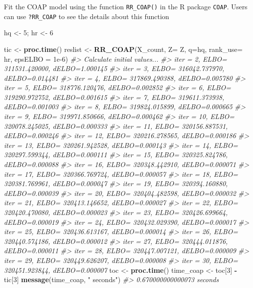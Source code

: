 \documentclass[
]{article}
\newenvironment{Shaded}{\begin{snugshade}}{\end{snugshade}}
\newcommand{\CommentTok}[1]{\textcolor[rgb]{0.56,0.35,0.01}{\textit{#1}}}
\newcommand{\DataTypeTok}[1]{\textcolor[rgb]{0.13,0.29,0.53}{#1}}
\newcommand{\DecValTok}[1]{\textcolor[rgb]{0.00,0.00,0.81}{#1}}
\newcommand{\FloatTok}[1]{\textcolor[rgb]{0.00,0.00,0.81}{#1}}
\newcommand{\KeywordTok}[1]{\textcolor[rgb]{0.13,0.29,0.53}{\textbf{#1}}}
\newcommand{\NormalTok}[1]{#1}
\newcommand{\OperatorTok}[1]{\textcolor[rgb]{0.81,0.36,0.00}{\textbf{#1}}}
\newcommand{\StringTok}[1]{\textcolor[rgb]{0.31,0.60,0.02}{#1}}
\begin{document}
Fit the COAP model using the function \texttt{RR\_COAP()} in the R
package \texttt{COAP}. Users can use \texttt{?RR\_COAP} to see the
details about this function

\begin{Shaded}
\begin{Highlighting}[]
\NormalTok{hq <-}\StringTok{ }\DecValTok{5}\NormalTok{; hr <-}\StringTok{ }\DecValTok{6}

\NormalTok{tic <-}\StringTok{ }\KeywordTok{proc.time}\NormalTok{()}
\NormalTok{reslist <-}\StringTok{ }\KeywordTok{RR_COAP}\NormalTok{(X_count, }\DataTypeTok{Z=}\NormalTok{ Z, }\DataTypeTok{q=}\NormalTok{hq, }\DataTypeTok{rank_use=}\NormalTok{ hr, }\DataTypeTok{epsELBO =} \FloatTok{1e-6}\NormalTok{)}
\CommentTok{#> Calculate initial values...}
\CommentTok{#> iter = 2, ELBO= 311531.420000, dELBO=1.000145 }
\CommentTok{#> iter = 3, ELBO= 316042.737970, dELBO=0.014481 }
\CommentTok{#> iter = 4, ELBO= 317869.490388, dELBO=0.005780 }
\CommentTok{#> iter = 5, ELBO= 318776.120476, dELBO=0.002852 }
\CommentTok{#> iter = 6, ELBO= 319290.972752, dELBO=0.001615 }
\CommentTok{#> iter = 7, ELBO= 319611.373938, dELBO=0.001003 }
\CommentTok{#> iter = 8, ELBO= 319824.015899, dELBO=0.000665 }
\CommentTok{#> iter = 9, ELBO= 319971.850666, dELBO=0.000462 }
\CommentTok{#> iter = 10, ELBO= 320078.245025, dELBO=0.000333 }
\CommentTok{#> iter = 11, ELBO= 320156.887531, dELBO=0.000246 }
\CommentTok{#> iter = 12, ELBO= 320216.278565, dELBO=0.000186 }
\CommentTok{#> iter = 13, ELBO= 320261.942528, dELBO=0.000143 }
\CommentTok{#> iter = 14, ELBO= 320297.599344, dELBO=0.000111 }
\CommentTok{#> iter = 15, ELBO= 320325.824786, dELBO=0.000088 }
\CommentTok{#> iter = 16, ELBO= 320348.442910, dELBO=0.000071 }
\CommentTok{#> iter = 17, ELBO= 320366.769724, dELBO=0.000057 }
\CommentTok{#> iter = 18, ELBO= 320381.769961, dELBO=0.000047 }
\CommentTok{#> iter = 19, ELBO= 320394.160880, dELBO=0.000039 }
\CommentTok{#> iter = 20, ELBO= 320404.482598, dELBO=0.000032 }
\CommentTok{#> iter = 21, ELBO= 320413.146652, dELBO=0.000027 }
\CommentTok{#> iter = 22, ELBO= 320420.470080, dELBO=0.000023 }
\CommentTok{#> iter = 23, ELBO= 320426.699664, dELBO=0.000019 }
\CommentTok{#> iter = 24, ELBO= 320432.029390, dELBO=0.000017 }
\CommentTok{#> iter = 25, ELBO= 320436.613167, dELBO=0.000014 }
\CommentTok{#> iter = 26, ELBO= 320440.574186, dELBO=0.000012 }
\CommentTok{#> iter = 27, ELBO= 320444.011876, dELBO=0.000011 }
\CommentTok{#> iter = 28, ELBO= 320447.007121, dELBO=0.000009 }
\CommentTok{#> iter = 29, ELBO= 320449.626207, dELBO=0.000008 }
\CommentTok{#> iter = 30, ELBO= 320451.923844, dELBO=0.000007}
\NormalTok{toc <-}\StringTok{ }\KeywordTok{proc.time}\NormalTok{()}
\NormalTok{time_coap <-}\StringTok{ }\NormalTok{toc[}\DecValTok{3}\NormalTok{] }\OperatorTok{-}\StringTok{ }\NormalTok{tic[}\DecValTok{3}\NormalTok{]}
\KeywordTok{message}\NormalTok{(time_coap, }\StringTok{" seconds"}\NormalTok{)}
\CommentTok{#> 0.670000000000073 seconds}
\end{Highlighting}
\end{Shaded}
\end{document}

